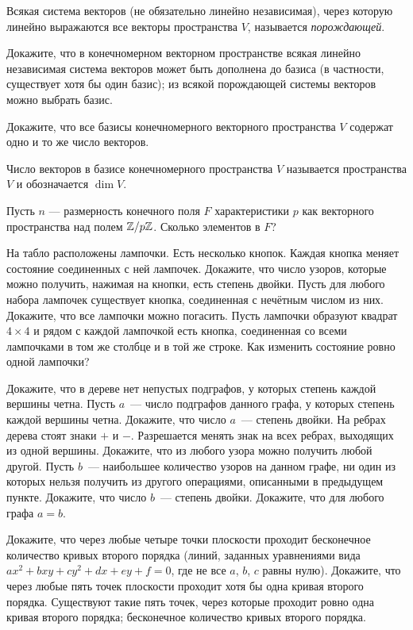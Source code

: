 \documentclass[a4paper,12pt]{article}
\begin{document}
 Всякая система векторов (не обязательно линейно независимая),
через которую линейно выражаются все векторы пространства $V$,
называется {\it порождающей}. 

 Докажите, что в конечномерном векторном пространстве
  всякая линейно независимая система векторов
может быть дополнена до базиса (в частности, существует хотя бы один
базис);  из всякой порождающей системы векторов можно выбрать
базис. 

 Докажите, что все базисы конечномерного векторного
пространства $V$ содержат одно и то же число векторов. 

 Число векторов в базисе конечномерного пространства $V$
называется  пространства $V$ и обозначается $\dim
V$. 

 Пусть $n$ --- размерность конечного поля $F$ характеристики $p$ как векторного пространства над полем $\mathbb{Z}/p\mathbb{Z}$. Сколько элементов в $F$? 


  На табло расположены лампочки. Есть несколько кнопок.
Каждая кнопка меняет состояние соединенных с ней лампочек. Докажите,
что число узоров, которые можно получить, нажимая на кнопки, есть
степень двойки.  Пусть для любого набора лампочек существует
кнопка, соединенная с нечётным числом из них. Докажите, что все
лампочки можно погасить.  Пусть лампочки образуют квадрат
$4\times 4$ и рядом с каждой лампочкой есть кнопка,
соединенная со всеми лампочками в том же столбце и в той же строке.
Как изменить состояние ровно одной лампочки? 

  Докажите, что в дереве нет непустых подграфов, у
которых степень каждой вершины четна.  Пусть $a$~--- число
подграфов данного графа, у которых степень каждой вершины четна.
Докажите, что число $a$~--- степень двойки.  На ребрах дерева 
стоят знаки $+$ и $-$. Разрешается менять знак на всех ребрах,
выходящих из одной вершины. Докажите, что из любого узора можно
получить любой другой.  Пусть $b$~--- наибольшее количество
узоров на данном графе, ни один из которых нельзя получить из
другого операциями, описанными в предыдущем пункте. Докажите, что
число $b$~--- степень двойки.  Докажите, что для любого графа
$a = b$. 



  Докажите, что через любые четыре точки плоскости
проходит бесконечное количество кривых второго порядка (линий, заданных уравнениями вида $ax^2 + bxy + cy^2 + dx + ey + f =
0$, где не все $a$, $b$, $c$ равны нулю).  Докажите, что через
любые пять точек плоскости проходит хотя бы одна кривая второго
порядка.  Существуют такие пять точек, через которые проходит
ровно одна кривая второго порядка; бесконечное количество кривых
второго порядка. 

	
	
\end{document}
